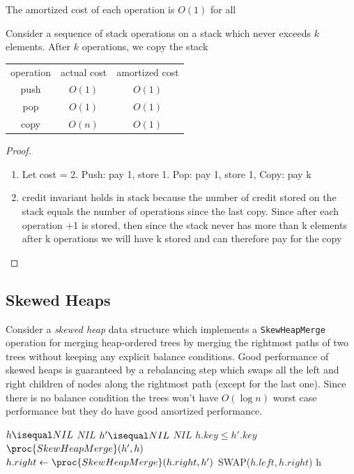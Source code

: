 \documentclass[../notes.tex]{subfiles}
\begin{document}
The amortized cost of each operation is $ O(1) $ for all


\begin{example}
	Consider a sequence of stack operations on a stack which never exceeds $ k $ elements. After $ k $ operations, we copy the stack
\begin{table}[ht]
	\centering
	\begin{tabular}{|c|c|c|}
		operation & actual cost & amortized cost \\
		push & $ O(1)$ & $ O(1) $\\
		pop & $ O(1) $&$ O(1) $ \\
		copy & $ O(n)$ & $ O(1) $
	\end{tabular}
\end{table}


\begin{proof}
	

\begin{enumerate}
	\item Let cost = 2. Push: pay 1, store 1. Pop: pay 1, store 1, Copy: pay k
	\item credit invariant holds in stack because the number of credit stored on the stack equals the number of operations since the last copy. Since after each operation +1 is stored, then since the stack never has more than k elements after k operations we will have k stored and can therefore pay for the copy
\end{enumerate}


\end{proof}
\end{example}




\subsection{Skewed Heaps}

Consider a \textit{skewed heap} data structure which implements a \texttt{SkewHeapMerge} operation for merging heap-ordered trees by merging the rightmost paths of two trees without keeping any explicit balance conditions.
Good performance of skewed heaps is guaranteed by a rebalancing step which swaps all the left and right children of nodes along the rightmost path (except for the last one).
Since there is no balance condition the trees won't have $ O(\log n) $ worst case performance but they do have good amortized performance.


\begin{codebox}
\li {}
\li \If $ h  \isequal NIL $\Then 
\li \Return $ NIL $ \End
\li \If $ h'  \isequal NIL $ \Then 
\li \Return $ NIL $ \End
\li \If $ h.key  \le h'.key $ \Then 
\li \Return $ \proc{SkewHeapMerge}(h', h) $ \End
\li $ h.right \gets \proc{SkewHeapMerge}(h.right, h') $
\li SWAP($ h.left, h.right $)
\li \Return h
\end{codebox}
\end{document}

